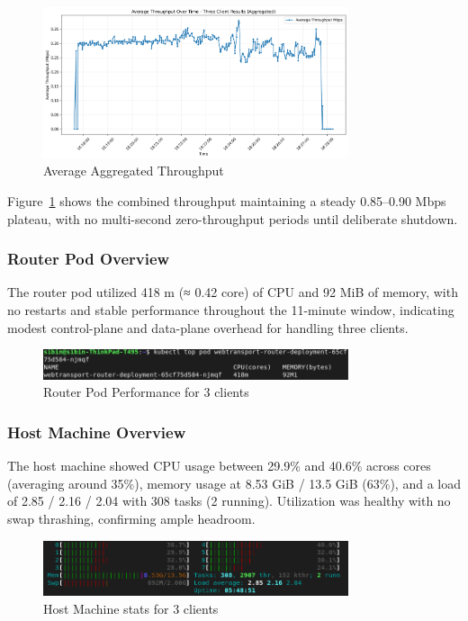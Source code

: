 \begin{figure}[h!]
\centering
\includegraphics[width=0.8\textwidth]{Evaluation/avg_throughput_aggregated_three-client-results.png}
\caption{Average Aggregated Throughput}
\label{fig:avg-throughput-aggregated}
\end{figure}
Figure~\ref{fig:avg-throughput-aggregated} shows the combined throughput maintaining a steady 0.85–0.90 Mbps plateau, with no multi-second zero-throughput periods until deliberate shutdown.

\subsubsection{Router Pod Overview}
The router pod utilized 418 m (≈ 0.42 core) of CPU and 92 MiB of memory, with no restarts and stable performance throughout the 11-minute window, indicating modest control-plane and data-plane overhead for handling three clients.
\begin{figure}[h!]
\centering
\includegraphics[width=0.8\textwidth]{Evaluation/three-clients-stats.png}
\caption{Router Pod Performance for 3 clients}
\label{fig:three-clients-stats}
\end{figure}

\subsubsection{Host Machine Overview}
The host machine showed CPU usage between 29.9\% and 40.6\% across cores (averaging around 35\%), memory usage at 8.53 GiB / 13.5 GiB (63\%), and a load of 2.85 / 2.16 / 2.04 with 308 tasks (2 running). Utilization was healthy with no swap thrashing, confirming ample headroom.

\begin{figure}[h!]
\centering
\includegraphics[width=0.8\textwidth]{Evaluation/three-clients-host-stats.png}
\caption{Host Machine stats for 3 clients}
\label{fig:three-clients-host-stats}
\end{figure}

